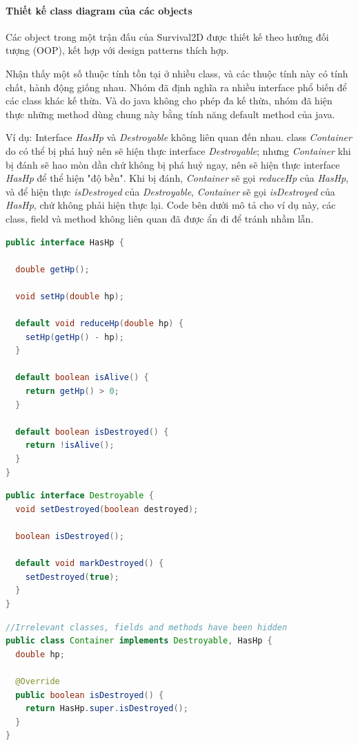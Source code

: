 \documentclass[12pt,a4paper]{article}
\begin{document}
  \paragraph{Thiết kế class diagram của các objects}\mbox{}

  Các object trong một trận đấu của Survival2D được thiết kế theo hướng đối tượng (OOP), kết hợp với design patterns thích hợp.

  Nhận thấy một số thuộc tính tồn tại ở nhiều class, và các thuộc tính này có tính chất, hành động giống nhau. Nhóm đã định nghĩa ra nhiều interface phổ biến để các class khác kế thừa. Và do java không cho phép đa kế thừa, nhóm đã hiện thực những method dùng chung này bằng tính năng default method của java.
  
  Ví dụ: Interface \textit{HasHp} và \textit{Destroyable} không liên quan đến nhau. class \textit{Container} do có thể bị phá huỷ nên sẽ hiện thực interface \textit{Destroyable}; nhưng \textit{Container} khi bị đánh sẽ hao mòn dần chứ không bị phá huỷ ngay, nên sẽ hiện thực interface \textit{HasHp} để thể hiện "độ bền". Khi bị đánh, \textit{Container} sẽ gọi \textit{reduceHp} của \textit{HasHp}, và để hiện thực \textit{isDestroyed} của \textit{Destroyable}, \textit{Container} sẽ gọi \textit{isDestroyed} của \textit{HasHp}, chứ không phải hiện thực lại. Code bên dưới mô tả cho ví dụ này, các class, field và method không liên quan đã được ẩn đi để tránh nhầm lẫn.

  \begin{lstlisting}[language=java]
public interface HasHp {

  double getHp();

  void setHp(double hp);

  default void reduceHp(double hp) {
    setHp(getHp() - hp);
  }

  default boolean isAlive() {
    return getHp() > 0;
  }

  default boolean isDestroyed() {
    return !isAlive();
  }
}
  \end{lstlisting}

  \begin{lstlisting}[language=java]
public interface Destroyable {
  void setDestroyed(boolean destroyed);
  
  boolean isDestroyed();
  
  default void markDestroyed() {
    setDestroyed(true);
  }
}
  \end{lstlisting}

    \begin{lstlisting}[language=java]
//Irrelevant classes, fields and methods have been hidden
public class Container implements Destroyable, HasHp {
  double hp;

  @Override
  public boolean isDestroyed() {
    return HasHp.super.isDestroyed();
  }
}
  \end{lstlisting}
\end{document}
